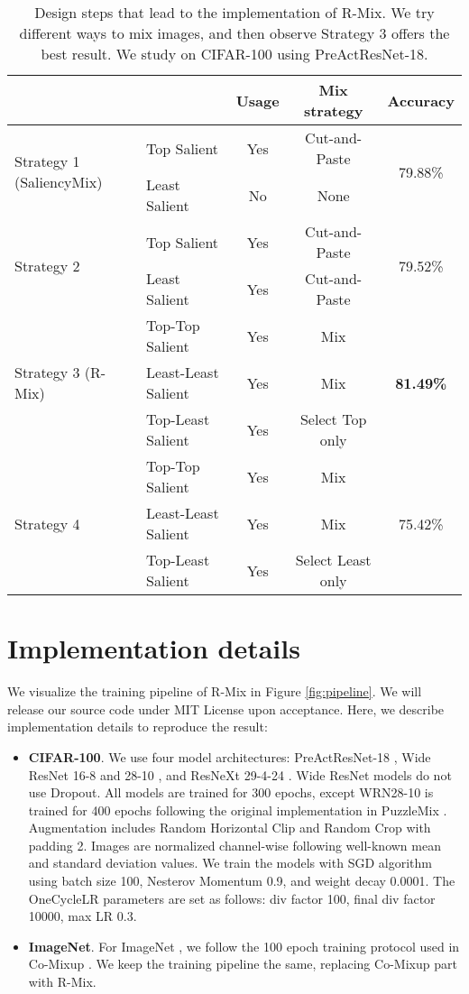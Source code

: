 \documentclass[letterpaper]{article} \usepackage[submission]{aaai23}  \usepackage{times}  \usepackage{helvet}  \usepackage{courier}  \usepackage[hyphens]{url}  \usepackage{graphicx} \urlstyle{rm} \def\UrlFont{\rm}  \usepackage{natbib}  \usepackage{caption} \frenchspacing  \setlength{\pdfpagewidth}{8.5in} \setlength{\pdfpageheight}{11in}
\newcommand{\comixup}{{Co-Mixup}}
\begin{document}
\begin{table*}[h!]
\centering
\begin{tabular}{llccc}
\hline
 &  & Usage & Mix strategy & Accuracy \\ \hline
\multirow{2}{*}{Strategy 1 (SaliencyMix)} & Top Salient & Yes & Cut-and-Paste & \multirow{2}{*}{79.88\%} \\
 & Least Salient & No & None &  \\ \hline
\multirow{2}{*}{Strategy 2} & Top Salient & Yes & Cut-and-Paste & \multirow{2}{*}{79.52\%} \\
 & Least Salient & Yes & Cut-and-Paste &  \\ \hline
\multirow{3}{*}{Strategy 3 (R-Mix)} & Top-Top Salient & Yes & Mix & \multirow{3}{*}{\textbf{81.49\%}} \\
 & Least-Least Salient & Yes & Mix &  \\
 & Top-Least Salient & Yes & Select Top only &  \\ \hline
\multirow{3}{*}{Strategy 4} & Top-Top Salient & Yes & Mix & \multirow{3}{*}{75.42\%} \\
 & Least-Least Salient & Yes & Mix &  \\
 & Top-Least Salient & Yes & Select Least only & \\ \hline
\end{tabular}
\caption{Design steps that lead to the implementation of R-Mix. We try different ways to mix images, and then observe Strategy 3 offers the best result. We study on CIFAR-100 using PreActResNet-18.}
\label{tab:study}
\end{table*}

\section*{Implementation details}
We visualize the training pipeline of R-Mix in Figure \ref{fig:pipeline}.  We will release our source code under MIT License upon acceptance. Here, we describe implementation details to reproduce the result:
\begin{itemize}
    \item \textbf{CIFAR-100}. We use four model architectures:
    PreActResNet-18 \cite{he2016preact}, Wide ResNet 16-8 and 28-10 \cite{zagoruyko2017widern}, and ResNeXt 29-4-24 \cite{xie2016resnext}. Wide ResNet models do not use Dropout. All models are trained for 300 epochs, except WRN28-10 is trained for 400 epochs following the original implementation in PuzzleMix \cite{kim2020puzzlemix}. Augmentation includes Random Horizontal Clip and Random Crop with padding 2. Images are normalized channel-wise following well-known mean and standard deviation values.
    We train the models with SGD algorithm using batch size 100, Nesterov Momentum 0.9, and weight decay 0.0001. The OneCycleLR parameters are set as follows: div factor 100, final div factor 10000, max LR 0.3.
    \item \textbf{ImageNet}. For ImageNet \cite{Russakovski2015ImageNet}, we follow the 100 epoch training protocol used in \comixup{} \cite{kim2021comixup}. We keep the training pipeline the same, replacing \comixup{} part with R-Mix.
\end{itemize}
\end{document}

